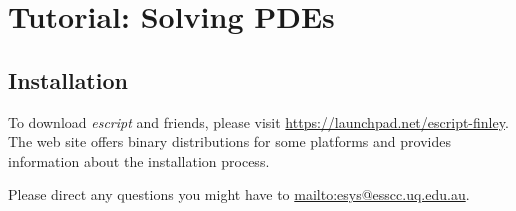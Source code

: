 
%
%
%

\chapter{Tutorial: Solving PDEs}
\label{CHAP: Tutorial}

\section{Installation}
\label{INSTALL}
To download {\it escript} and friends, please visit \url{https://launchpad.net/escript-finley}. 
The web site offers binary distributions for some platforms and provides information about the installation process.

Please direct any questions you might have to \url{mailto:esys@esscc.uq.edu.au}.






% 

